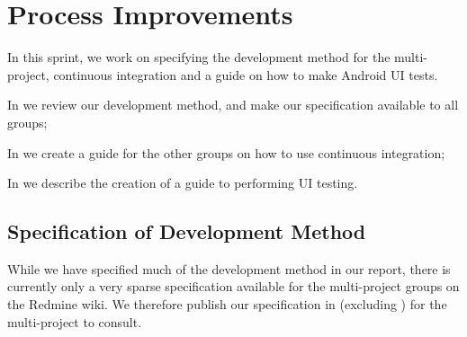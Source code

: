 \chapter{Process Improvements}
In this sprint, we work on specifying the development method for the multi-project, continuous integration and a guide on how to make Android UI tests.

\begin{chapterorganization}
  \item In  we review our development method, and make our specification available to all groups;
  \item In  we create a guide for the other groups on how to use continuous integration;
  \item In  we describe the creation of a guide to performing UI testing.
\end{chapterorganization}

\section{Specification of Development Method}\label{sec:processspecs}
While we have specified much of the development method in our report, there is currently only a very sparse specification available for the multi-project groups on the Redmine wiki. We therefore publish our specification in  (excluding ) for the multi-project to consult.


